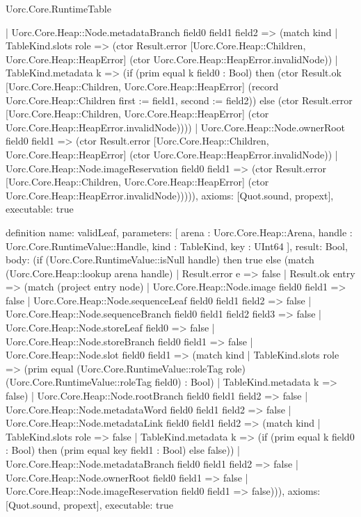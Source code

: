 \begin{lexlean}{Uorc.Core.RuntimeTable}
\begin{semanticmodule}
{      | Uorc.Core.Heap::Node.metadataBranch field0 field1 field2 => (match kind
        | TableKind.slots role => (ctor Result.error [Uorc.Core.Heap::Children, Uorc.Core.Heap::HeapError] (ctor Uorc.Core.Heap::HeapError.invalidNode))
        | TableKind.metadata k => (if (prim equal k field0 : Bool) then (ctor Result.ok [Uorc.Core.Heap::Children, Uorc.Core.Heap::HeapError] (record Uorc.Core.Heap::Children {first := field1, second := field2})) else (ctor Result.error [Uorc.Core.Heap::Children, Uorc.Core.Heap::HeapError] (ctor Uorc.Core.Heap::HeapError.invalidNode))))
      | Uorc.Core.Heap::Node.ownerRoot field0 field1 => (ctor Result.error [Uorc.Core.Heap::Children, Uorc.Core.Heap::HeapError] (ctor Uorc.Core.Heap::HeapError.invalidNode))
      | Uorc.Core.Heap::Node.imageReservation field0 field1 => (ctor Result.error [Uorc.Core.Heap::Children, Uorc.Core.Heap::HeapError] (ctor Uorc.Core.Heap::HeapError.invalidNode))))),
  axioms: [Quot.sound, propext],
  executable: true
}

definition{
  name: validLeaf,
  parameters: [
    arena : Uorc.Core.Heap::Arena,
    handle : Uorc.Core.RuntimeValue::Handle,
    kind : TableKind,
    key : UInt64
  ],
  result: Bool,
  body: (if (Uorc.Core.RuntimeValue::isNull handle) then true else (match (Uorc.Core.Heap::lookup arena handle)
    | Result.error e => false
    | Result.ok entry => (match (project entry node)
      | Uorc.Core.Heap::Node.image field0 field1 => false
      | Uorc.Core.Heap::Node.sequenceLeaf field0 field1 field2 => false
      | Uorc.Core.Heap::Node.sequenceBranch field0 field1 field2 field3 => false
      | Uorc.Core.Heap::Node.storeLeaf field0 => false
      | Uorc.Core.Heap::Node.storeBranch field0 field1 => false
      | Uorc.Core.Heap::Node.slot field0 field1 => (match kind
        | TableKind.slots role => (prim equal (Uorc.Core.RuntimeValue::roleTag role) (Uorc.Core.RuntimeValue::roleTag field0) : Bool)
        | TableKind.metadata k => false)
      | Uorc.Core.Heap::Node.rootBranch field0 field1 field2 => false
      | Uorc.Core.Heap::Node.metadataWord field0 field1 field2 => false
      | Uorc.Core.Heap::Node.metadataLink field0 field1 field2 => (match kind
        | TableKind.slots role => false
        | TableKind.metadata k => (if (prim equal k field0 : Bool) then (prim equal key field1 : Bool) else false))
      | Uorc.Core.Heap::Node.metadataBranch field0 field1 field2 => false
      | Uorc.Core.Heap::Node.ownerRoot field0 field1 => false
      | Uorc.Core.Heap::Node.imageReservation field0 field1 => false))),
  axioms: [Quot.sound, propext],
  executable: true
}


\end{semanticmodule}
\end{lexlean}
